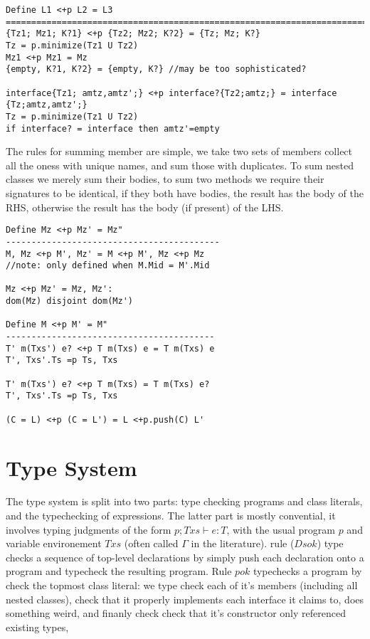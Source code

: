 \begin{verbatim}
Define L1 <+p L2 = L3
========================================================================================
{Tz1; Mz1; K?1} <+p {Tz2; Mz2; K?2} = {Tz; Mz; K?}
Tz = p.minimize(Tz1 U Tz2)
Mz1 <+p Mz1 = Mz
{empty, K?1, K?2} = {empty, K?} //may be too sophisticated?

interface{Tz1; amtz,amtz';} <+p interface?{Tz2;amtz;} = interface {Tz;amtz,amtz';}
Tz = p.minimize(Tz1 U Tz2)
if interface? = interface then amtz'=empty
\end{verbatim}

The rules for summing member are simple, we take two sets of members collect all the oness with unique names, and sum those with duplicates.
To sum nested classes we merely sum their bodies, to sum two methods we require their signatures to be identical, if they both have bodies, the result has the body of the RHS, otherwise the result has the body (if present) of the LHS.
\begin{verbatim}
Define Mz <+p Mz' = Mz"
------------------------------------------
M, Mz <+p M', Mz' = M <+p M', Mz <+p Mz
//note: only defined when M.Mid = M'.Mid

Mz <+p Mz' = Mz, Mz':
dom(Mz) disjoint dom(Mz')

Define M <+p M' = M"
-----------------------------------------
T' m(Txs') e? <+p T m(Txs) e = T m(Txs) e
T', Txs'.Ts =p Ts, Txs

T' m(Txs') e? <+p T m(Txs) = T m(Txs) e?
T', Txs'.Ts =p Ts, Txs

(C = L) <+p (C = L') = L <+p.push(C) L'
\end{verbatim}

\section{Type System}

The type system is split into two parts: type checking programs and class literals, and the typechecking of expressions. The latter part is mostly convential, it involves typing judgments of the form $p; Txs \vdash e : T$, with the usual program $p$ and variable environement $Txs$ (often called $\Gamma$ in the literature). rule ($Ds ok$) type checks a sequence of top-level declarations by simply push each declaration onto a program and typecheck the resulting program.
Rule $p ok$ typechecks a program by check the topmost class literal: we type check each of it’s members (including all nested classes), check that it properly implements each interface it claims to, does something weird, and finanly check check that it’s constructor only referenced existing types,

